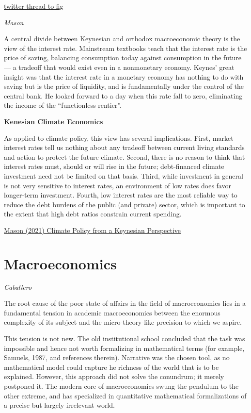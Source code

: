 \documentclass[
]{book}
\begin{document}
\href{https://twitter.com/robertmanduca/status/1574509720030703616/photo/1}{twitter thread to fig}

\emph{Mason}

A central divide between Keynesian and orthodox macroeconomic theory is the view of the interest rate. Mainstream textbooks teach that the interest rate is the price of saving, balancing consumption today against consumption in the future --- a tradeoff that would exist even in a nonmonetary economy. Keynes' great insight was that the interest rate in a monetary economy has nothing to do with saving but is the price of liquidity, and is fundamentally under the control of the central bank. He looked forward to a day when this rate fall to zero, eliminating the income of the ``functionless rentier''.

\textbf{Kenesian Climate Economics}

As applied to climate policy, this view has several implications. First, market interest rates tell us nothing about any tradeoff between current living standards and action to protect the future climate. Second, there is no reason to think that interest rates must, should or will rise in the future; debt-financed climate investment need not be limited on that basis. Third, while investment in general is not very sensitive to interest rates, an environment of low rates does favor longer-term investment. Fourth, low interest rates are the most reliable way to reduce the debt burdens of the public (and private) sector, which is important to the extent that high debt ratios constrain current spending.

\href{http://jwmason.org/slackwire/climate-policy-from-a-keynesian-perspective/}{Mason (2021) Climate Policy from a Keynesian Perspective}

\hypertarget{macroeconomics-1}{%
\chapter{Macroeconomics}\label{macroeconomics-1}}

\emph{Caballero}

The root cause of the poor state of affairs in the field of macroeconomics lies in a
fundamental tension in academic macroeconomics between the enormous complexity of its
subject and the micro-theory-like precision to which we aspire.

This tension is not new. The old institutional school concluded that the task was
impossible and hence not worth formalizing in mathematical terms (for example, Samuels, 1987,
and references therein). Narrative was the chosen tool, as no mathematical model could capture
he richness of the world that is to be explained. However, this approach did not solve the
conundrum; it merely postponed it. The modern core of macroeconomics swung the pendulum
to the other extreme, and has specialized in quantitative mathematical formalizations of a precise
but largely irrelevant world.
\end{document}
